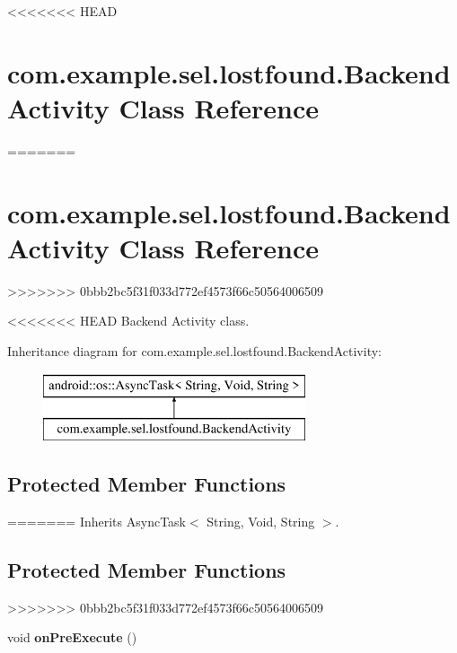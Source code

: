 <<<<<<< HEAD
\hypertarget{classcom_1_1example_1_1sel_1_1lostfound_1_1BackendActivity}{\section{com.\-example.\-sel.\-lostfound.\-Backend\-Activity Class Reference}
=======
\hypertarget{classcom_1_1example_1_1sel_1_1lostfound_1_1BackendActivity}{\section{com.\-example.\-sel.\-lostfound.\-Backend\-Activity \-Class \-Reference}
>>>>>>> 0bbb2bc5f31f033d772ef4573f66c50564006509
\label{classcom_1_1example_1_1sel_1_1lostfound_1_1BackendActivity}
}


<<<<<<< HEAD
Backend Activity class.  


Inheritance diagram for com.\-example.\-sel.\-lostfound.\-Backend\-Activity\-:\begin{figure}[H]
\begin{center}
\leavevmode
\includegraphics[height=2.000000cm]{classcom_1_1example_1_1sel_1_1lostfound_1_1BackendActivity}
\end{center}
\end{figure}
\subsection*{Protected Member Functions}
=======
\-Inherits \-Async\-Task$<$ String, Void, String $>$.

\subsection*{\-Protected \-Member \-Functions}
>>>>>>> 0bbb2bc5f31f033d772ef4573f66c50564006509
\begin{DoxyCompactItemize}
\item 
\hypertarget{classcom_1_1example_1_1sel_1_1lostfound_1_1BackendActivity_a679cd5822b3d0b71b8a947eab9ff6c79}{void {\bfseries on\-Pre\-Execute} ()}\label{classcom_1_1example_1_1sel_1_1lostfound_1_1BackendActivity_a679cd5822b3d0b71b8a947eab9ff6c79}


\end{DoxyCompactItemize}}
